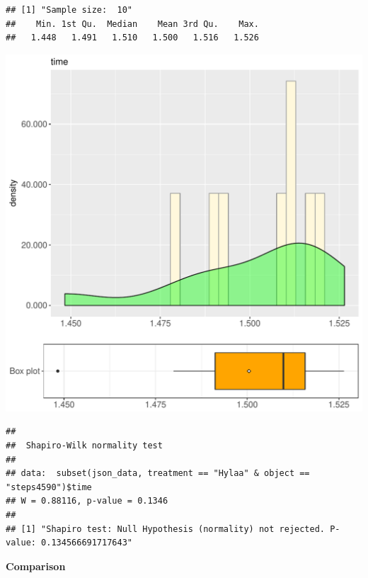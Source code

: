 \documentclass{article}\usepackage[]{graphicx}\usepackage[]{color}
\makeatletter
\def\maxwidth{ %
  \ifdim\Gin@nat@width>\linewidth
    \linewidth
  \else
    \Gin@nat@width
  \fi
}
\newenvironment{kframe}{%
 \def\at@end@of@kframe{}%
 \ifinner\ifhmode%
  \def\at@end@of@kframe{\end{minipage}}%
  \begin{minipage}{\columnwidth}%
 \fi\fi%
 \def\FrameCommand##1{\hskip\@totalleftmargin \hskip-\fboxsep
 \colorbox{shadecolor}{##1}\hskip-\fboxsep
     \hskip-\linewidth \hskip-\@totalleftmargin \hskip\columnwidth}%
 \MakeFramed {\advance\hsize-\width
   \@totalleftmargin\z@ \linewidth\hsize
   \@setminipage}}%
 {\par\unskip\endMakeFramed%
 \at@end@of@kframe}
\newenvironment{knitrout}{}{} %
\makeatother
\begin{document}
\begin{knitrout}
\color{fgcolor}\begin{kframe}
\begin{verbatim}
## [1] "Sample size:  10"
##    Min. 1st Qu.  Median    Mean 3rd Qu.    Max. 
##   1.448   1.491   1.510   1.500   1.516   1.526
\end{verbatim}
\end{kframe}
\includegraphics[width=\maxwidth]{figure/RH2_Hylaa_steps4590-1} 
\begin{kframe}\begin{verbatim}
## 
## 	Shapiro-Wilk normality test
## 
## data:  subset(json_data, treatment == "Hylaa" & object == "steps4590")$time
## W = 0.88116, p-value = 0.1346
## 
## [1] "Shapiro test: Null Hypothesis (normality) not rejected. P-value: 0.134566691717643"
\end{verbatim}
\end{kframe}
\end{knitrout}
  
 \textbf{Comparison}
  
\end{document}
